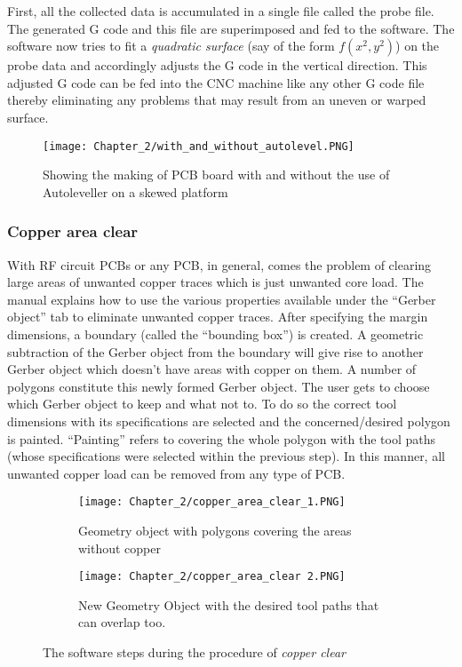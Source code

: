 First, all the collected data is accumulated in a single file called the probe file. The generated G code and this file are superimposed and fed to the software. The software now tries to fit a \textit{quadratic surface} (say of the form $f(x^{2},y^{2})$) on the probe data and accordingly adjusts the G code in the vertical direction. This adjusted G code can be fed into the CNC machine like any other G code file thereby eliminating any problems that may result from an uneven or warped surface.

\begin{figure}[h]
 \centering
 \texttt{[image: Chapter\_2/with\_and\_without\_autolevel.PNG]}
 \caption{Showing the making of PCB board with and
  without the use of Autoleveller on a skewed platform}
 \label{fig:with_without_auto}
\end{figure}

\subsubsection*{Copper area clear}

With RF circuit PCBs or any PCB, in general, comes the problem of clearing large areas of unwanted copper traces which is just unwanted core load. The manual explains how to use the various properties available under the “Gerber object” tab to eliminate unwanted copper traces. After specifying the margin dimensions, a boundary (called the “bounding box”) is created. A geometric subtraction of the Gerber object from the boundary will give rise to another Gerber object which doesn’t have areas with copper on them. A number of polygons constitute this newly formed Gerber object. The user gets to choose which Gerber object to keep and what not to. To do so the correct tool dimensions with its specifications are selected and the concerned/desired polygon is painted. “Painting” refers to covering the whole polygon with the tool paths (whose specifications were selected within the previous step). In this manner, all unwanted copper load can be removed from any type of PCB.

\begin{figure}[ht]
 \begin{subfigure}{0.5\textwidth}
  \texttt{[image: Chapter\_2/copper\_area\_clear\_1.PNG]}
  \caption{Geometry object with polygons covering the areas without copper}
  \label{fig:copper_clear_1}
 \end{subfigure}
 \begin{subfigure}{0.5\textwidth}
  \texttt{[image: Chapter\_2/copper\_area\_clear 2.PNG]}
  \caption{New Geometry Object with the desired tool paths that can overlap too.}
  \label{fig:copper_clear_2}
 \end{subfigure}

 \caption{The software steps during the procedure of \textit{copper clear}}
 \label{fig:copper_clear}
\end{figure}

